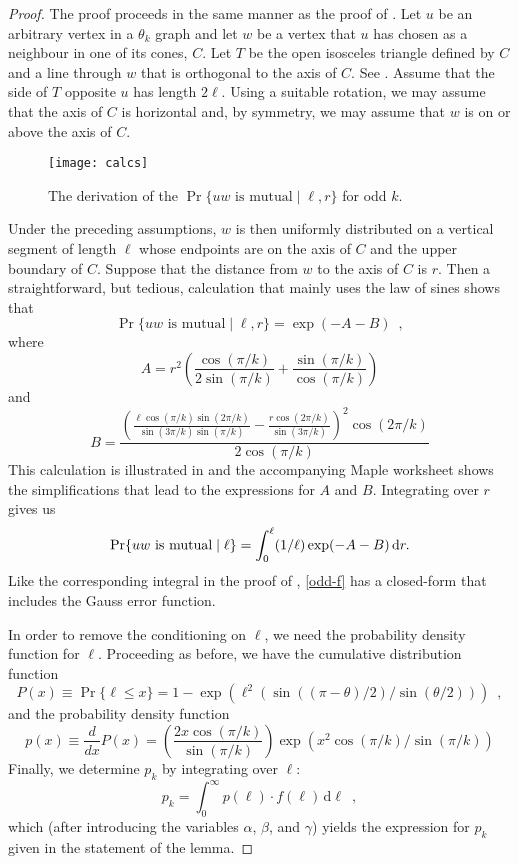 \documentclass{patmorin}
\begin{document}
\begin{proof}
  The proof proceeds in the same manner as the proof of .
  Let $u$ be an arbitrary vertex in a $\theta_k$ graph and let $w$ be
  a vertex that $u$ has chosen as a neighbour in one of its cones, $C$.
  Let $T$ be the open isosceles triangle defined by $C$ and a line through
  $w$ that is orthogonal to the axis of $C$. See .
  Assume that the side of $T$ opposite $u$ has length $2\ell$.  Using a
  suitable rotation, we may assume that the axis of $C$ is horizontal and,
  by symmetry, we may assume that $w$ is on or above the axis of $C$.
 
  \begin{figure}
    \texttt{[image: calcs]}
    \caption{The derivation of the $\Pr\{\mbox{$uw$ is mutual}\mid \ell,r\}$
             for odd $k$.}
  \end{figure}
  Under the preceding assumptions, $w$ is then uniformly distributed on
  a vertical segment of length $\ell$ whose endpoints are on the axis
  of $C$ and the upper boundary of $C$.  Suppose that the distance from
  $w$ to the axis of $C$ is $r$.  Then a straightforward, but tedious,
  calculation that mainly uses the law of sines shows that
  \[
      \Pr\{\mbox{$uw$ is mutual}\mid \ell, r\} = \exp(-A-B) \enspace ,
  \]
  where
  \[ 
      A = r^2\left(\frac{\cos(\pi/k)}{2\sin(\pi/k)}+\frac{\sin(\pi/k)}{\cos(\pi/k)}\right)
  \]
  and
  \[
      B = \frac{\left(\frac{\ell\cos(\pi/k)\sin(2\pi/k)}{\sin(3\pi/k)\sin(\pi/k)}-\frac{r\cos(2\pi/k)}{\sin(3\pi/k)}\right)^2\cos(2\pi/k)}{2\cos(\pi/k)}
  \]
  This calculation is illustrated in  and the
  accompanying Maple worksheet shows the simplifications that lead to
  the expressions for $A$ and $B$.  Integrating over $r$ gives us
  \begin{equation}
    \Pr\{\mbox{$uw$ is mutual}\mid \ell\} = 
      \int_0^\ell (1/\ell)\exp(-A-B)\,\mathrm{d}r . \eqlabel{odd-f}
  \end{equation}
  Like the corresponding integral in the proof of ,
  \eqref{odd-f} has a closed-form that includes the Gauss error function.

  In order to remove the conditioning on $\ell$, we need the probability
  density function for $\ell$.  Proceeding as before, we have the
  cumulative distribution function
  \[
     P(x) \equiv \Pr\{\ell\le x\} 
          = 1 - \exp(\ell^2(\sin((\pi-\theta)/2)/\sin(\theta/2))) \enspace ,
  \]
  and the probability density function
  \[
    p(x)\equiv \frac{d}{dx}P(x) = 
     \left(\frac{2x\cos(\pi/k)}{\sin(\pi/k)}\right)
      \exp(x^2\cos(\pi/k)/\sin(\pi/k))
  \]
  Finally, we determine $p_k$ by integrating over $\ell$:
  \[
     p_k = \int_0^\infty p(\ell)\cdot f(\ell)\, \mathrm{d}{\ell} \enspace ,
  \]
  which (after introducing the variables $\alpha$, $\beta$, and $\gamma$)
  yields the expression for $p_k$ given in the statement of the lemma.
\end{proof}
\end{document}
